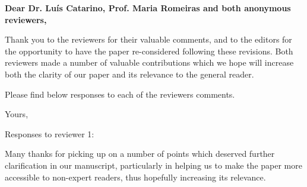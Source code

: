 \documentclass[a4paper]{letter}
\begin{document}



\begin{letter}{} %


	\opening{\textbf{Dear Dr. Lu\'{i}s Catarino, Prof. Maria Romeiras and both anonymous reviewers,}}
 
Thank you to the reviewers for their valuable comments, and to the editors for the opportunity to have the paper re-considered following these revisions. Both reviewers made a number of valuable contributions which we hope will increase both the clarity of our paper and its relevance to the general reader. 

Please find below responses to each of the reviewers comments.

\vspace{\parskip} %
\closing{Yours,}
\vspace{2\parskip} %



\newpage{}
Responses to reviewer 1:

Many thanks for picking up on a number of points which deserved further clarification in our manuscript, particularly in helping us to make the paper more accessible to non-expert readers, thus hopefully increasing its relevance.


\end{letter}
\end{document}
